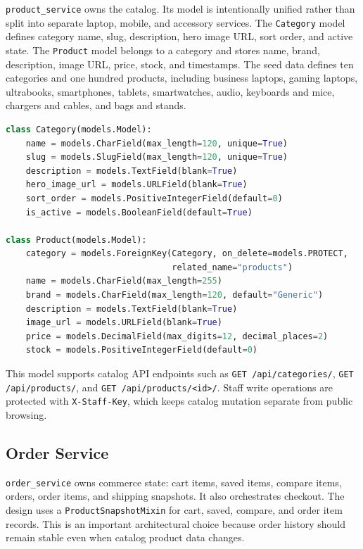 \documentclass[12pt,a4paper]{article}
\begin{document}
\texttt{product\_service} owns the catalog. Its model is intentionally unified rather than split into separate laptop, mobile, and accessory services. The \texttt{Category} model defines category name, slug, description, hero image URL, sort order, and active state. The \texttt{Product} model belongs to a category and stores name, brand, description, image URL, price, stock, and timestamps. The seed data defines ten categories and one hundred products, including business laptops, gaming laptops, ultrabooks, smartphones, tablets, smartwatches, audio, keyboards and mice, chargers and cables, and bags and stands.

\begin{lstlisting}[language=Python,caption={Core catalog model structure.}]
class Category(models.Model):
    name = models.CharField(max_length=120, unique=True)
    slug = models.SlugField(max_length=120, unique=True)
    description = models.TextField(blank=True)
    hero_image_url = models.URLField(blank=True)
    sort_order = models.PositiveIntegerField(default=0)
    is_active = models.BooleanField(default=True)

class Product(models.Model):
    category = models.ForeignKey(Category, on_delete=models.PROTECT,
                                 related_name="products")
    name = models.CharField(max_length=255)
    brand = models.CharField(max_length=120, default="Generic")
    description = models.TextField(blank=True)
    image_url = models.URLField(blank=True)
    price = models.DecimalField(max_digits=12, decimal_places=2)
    stock = models.PositiveIntegerField(default=0)
\end{lstlisting}

This model supports catalog API endpoints such as \texttt{GET /api/categories/}, \texttt{GET /api/products/}, and \texttt{GET /api/products/<id>/}. Staff write operations are protected with \texttt{X-Staff-Key}, which keeps catalog mutation separate from public browsing.

\subsection{Order Service}

\texttt{order\_service} owns commerce state: cart items, saved items, compare items, orders, order items, and shipping snapshots. It also orchestrates checkout. The design uses a \texttt{ProductSnapshotMixin} for cart, saved, compare, and order item records. This is an important architectural choice because order history should remain stable even when catalog product data changes.
\end{document}
